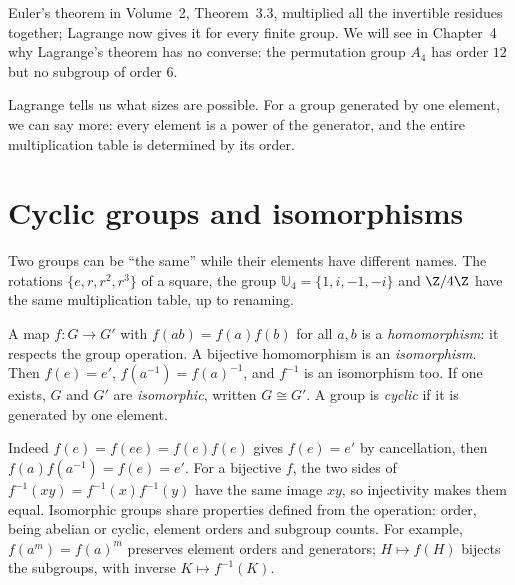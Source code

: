 Euler's theorem in Volume~2, Theorem~3.3, multiplied all the invertible residues together;
Lagrange now gives it for every finite group. We will see in Chapter~4 why
Lagrange's theorem has no converse: the permutation group $A_4$ has order
$12$ but no subgroup of order $6$.

Lagrange tells us what sizes are possible. For a group generated by one element, we can say more: every element is a power of the generator, and the entire multiplication table is determined by its order.

\section{Cyclic groups and isomorphisms}

Two groups can be ``the same'' while their elements have different names. The rotations $\{e,r,r^2,r^3\}$ of a square, the group $\mathbb U_4=\{1,i,-1,-i\}$ and $\Z/4\Z$ have the same multiplication table, up to renaming.

\begin{definition}
A map $f:G\to G'$ with $f(ab)=f(a)f(b)$ for all $a,b$ is a \emph{homomorphism}: it respects the group operation. A bijective homomorphism is an \emph{isomorphism}. Then $f(e)=e'$, $f(a^{-1})=f(a)^{-1}$, and $f^{-1}$ is an isomorphism too. If one exists, $G$ and $G'$ are \emph{isomorphic}, written $G\cong G'$. A group is \emph{cyclic} if it is generated by one element.
\end{definition}

Indeed $f(e)=f(ee)=f(e)f(e)$ gives $f(e)=e'$ by cancellation, then
$f(a)f(a^{-1})=f(e)=e'$. For a bijective $f$, the two sides of
$f^{-1}(xy)=f^{-1}(x)f^{-1}(y)$ have the same image $xy$, so injectivity
makes them equal. Isomorphic groups share properties defined from the
operation: order, being abelian or cyclic, element orders and subgroup counts.
For example, $f(a^m)=f(a)^m$ preserves element orders and generators;
$H\mapsto f(H)$ bijects the subgroups, with inverse $K\mapsto f^{-1}(K)$.

